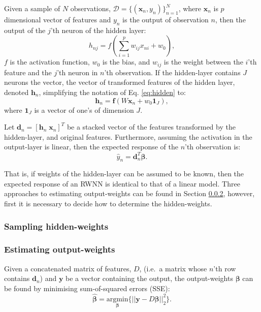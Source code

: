 \documentclass[
]{jss}
\begin{document}
Given a sample of \(N\) observations,
\(\mathcal D = \{(\boldsymbol x_n, y_n)\}_{n = 1}^N\), where
\(\boldsymbol x_n\) is \(p\) dimensional vector of features and \(y_n\)
is the output of observation \(n\), then the output of the \(j\)'th
neuron of the hidden layer: \begin{equation}
h_{nj} = f\left(\sum_{i = 1}^p w_{ij} x_{ni} + w_{0}\right), \label{eq:hidden}
\end{equation} \(f\) is the activation function, \(w_0\) is the bias,
and \(w_{ij}\) is the weight between the \(i\)'th feature and the
\(j\)'th neuron in \(n\)'th observation. If the hidden-layer contains
\(J\) neurons the vector, the vector of transformed features of the
hidden layer, denoted \(\boldsymbol h_{n}\), simplifying the notation of
Eq. \eqref{eq:hidden} to: \begin{equation}
\boldsymbol h_n = \boldsymbol f\left(W \boldsymbol{x}_n + w_0 \boldsymbol{1}_{J}\right),
\end{equation} where \(\boldsymbol{1}_{J}\) is a vector of one's of
dimension \(J\).

Let \(\boldsymbol d_n = [\boldsymbol h_n \; \boldsymbol x_n]^T\) be a
stacked vector of the features transformed by the hidden-layer, and
original features. Furthermore, assuming the activation in the
output-layer is linear, then the expected response of the \(n\)'th
observation is: \begin{equation}
\hat{y}_n = \boldsymbol d^T_n \boldsymbol \beta.
\end{equation}

That is, if weights of the hidden-layer can be assumed to be known, then
the expected response of an RWNN is identical to that of a linear model.
Three approaches to estimating output-weights can be found in Section
\ref{EST}, however, first it is necessary to decide how to determine the
hidden-weights.

\hypertarget{HST}{%
\subsubsection{Sampling hidden-weights}\label{HST}}

\hypertarget{EST}{%
\subsubsection{Estimating output-weights}\label{EST}}

Given a concatenated matrix of features, \(D\), (i.e.~a matrix whose
\(n\)'th row contains \(\boldsymbol d_n\)) and \(\boldsymbol y\) be a
vector containing the output, the output-weights \(\boldsymbol \beta\)
can be found by minimising sum-of-squared errors (SSE): \begin{equation}
\hat{\boldsymbol{\beta}} = \underset{\boldsymbol{\beta}}{\text{argmin}} \Big\{ || \boldsymbol{y} - D\boldsymbol{\beta}||_2^2\Big\}. \label{eq:ssq}
\end{equation}
\end{document}
